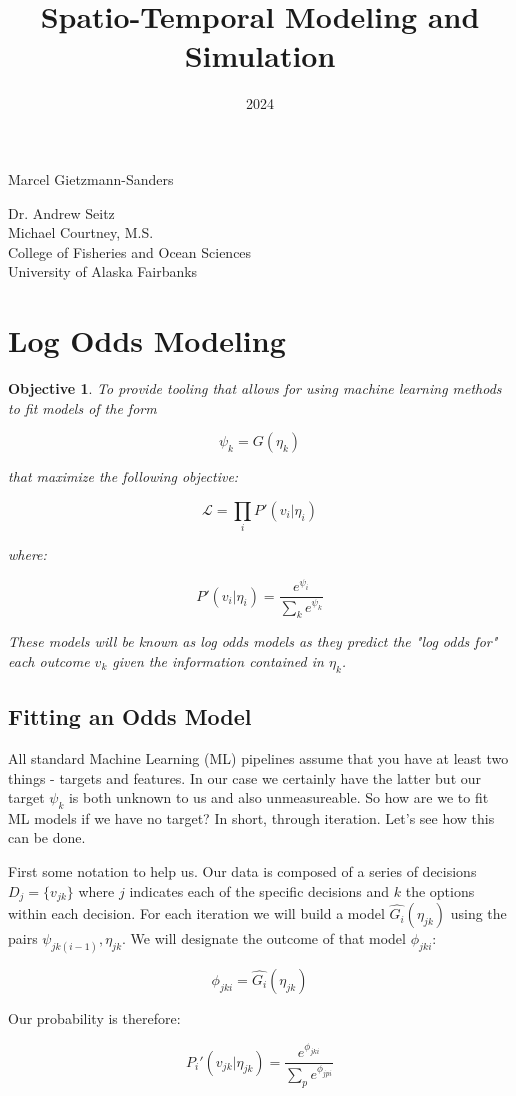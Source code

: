 \documentclass[11pt]{article}
\title{Spatio-Temporal Modeling and Simulation}
\date{2024}
\makeatletter
\newtheorem{objective}{Objective}
\renewcommand{\maketitle}{
\begin{center}

\pagestyle{empty}
\phantom{.}  %
\vspace{3cm}

{\Huge \bf \@title\par}
\vspace{2.5cm}

{\LARGE Marcel Gietzmann-Sanders}\\[1cm]

{\Large\@date}

\vspace{2.5cm}
{\Large Dr. Andrew Seitz}\hspace{2cm}{\Large Dr. Curry Cunningham}\\[2cm]{\Large Michael Courtney, M.S.}\\[2cm]
College of Fisheries and Ocean Sciences\\
University of Alaska Fairbanks


\end{center}
}\makeatother
\makeatother
\begin{document}
\maketitle
\newpage
\tableofcontents
\newpage

\section{Log Odds Modeling}

\begin{objective}
To provide tooling that allows for using machine learning methods to fit models of the form

$$\psi_k = G(\eta_k)$$

that maximize the following objective:


$$\mathcal{L}=\prod_i P'(v_i | \eta_i)$$

where:

$$P'(v_i|\eta_i) = \frac{e^{\psi_i}}{\sum_k e^{\psi_k}}$$

These models will be known as log odds models as they predict the "log odds for" each outcome $v_k$ given the information contained in $\eta_k$. 

\end{objective}

\subsection{Fitting an Odds Model}

All standard Machine Learning (ML) pipelines assume that you have at least two things - targets and features. In our case we certainly have the latter but our target $\psi_k$ is both unknown to us and also unmeasureable. So how are we to fit ML models if we have no target? In short, through iteration. Let's see how this can be done.\newline

First some notation to help us. Our data is composed of a series of decisions $D_j=\lbrace v_{jk} \rbrace$ where $j$ indicates each of the specific decisions and $k$ the options within each decision. For each iteration we will build a model $\hat{G_i}(\eta_{jk})$ using the pairs $\psi_{jk(i-1)},\eta_{jk}$. We will designate the outcome of that model $\phi_{jki}$:

$$\phi_{jki} = \hat{G_i}(\eta_{jk})$$

Our probability is therefore:

$$P_i'(v_{jk}|\eta_{jk})=\frac{e^{\phi_{jki}}}{\sum_p e^{\phi_{jpi}}}$$
\end{document}
